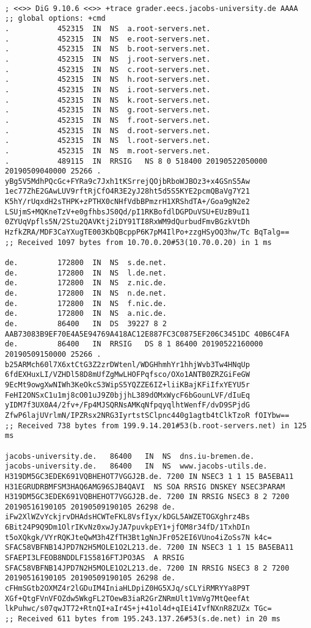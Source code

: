 \documentclass{article}
\begin{document}
\begin{verbatim}

; <<>> DiG 9.10.6 <<>> +trace grader.eecs.jacobs-university.de AAAA
;; global options: +cmd
.			452315	IN	NS	a.root-servers.net.
.			452315	IN	NS	e.root-servers.net.
.			452315	IN	NS	b.root-servers.net.
.			452315	IN	NS	j.root-servers.net.
.			452315	IN	NS	c.root-servers.net.
.			452315	IN	NS	h.root-servers.net.
.			452315	IN	NS	i.root-servers.net.
.			452315	IN	NS	k.root-servers.net.
.			452315	IN	NS	g.root-servers.net.
.			452315	IN	NS	f.root-servers.net.
.			452315	IN	NS	d.root-servers.net.
.			452315	IN	NS	l.root-servers.net.
.			452315	IN	NS	m.root-servers.net.
.			489115	IN	RRSIG	NS 8 0 518400 20190522050000 20190509040000 25266 . yBg5V5MdhPQcGc+FYRa9c7Jxh1tKSrrejQOjbRboWJBOz3+x4GSnS5Aw 1ec77ZhE2GAwLUV9rftRjCfO4R3E2yJ28ht5d5S5KYE2pcmQBaVg7Y21 K5hY/rUqxdH2sTHPK+zPTHX0cNHfVdbBPmzrH1XRShdTA+/Goa9gN2e2 LSUjmS+MQKneTzV+e0gfhbsJS0Qd/pI1RKBofdlDGPDuVSU+EUzB9uI1 0ZYUqVpfls5N/2Stu2QAVKtj2iDY91TI8RxWM9dQurbudFmvBGzkVtDh HzfkZRA/MDF3CaYXugTE003KbQBcppP6K7pM4IlPo+zzgHSyOQ3hw/Tc BqTalg==
;; Received 1097 bytes from 10.70.0.20#53(10.70.0.20) in 1 ms

de.			172800	IN	NS	s.de.net.
de.			172800	IN	NS	l.de.net.
de.			172800	IN	NS	z.nic.de.
de.			172800	IN	NS	n.de.net.
de.			172800	IN	NS	f.nic.de.
de.			172800	IN	NS	a.nic.de.
de.			86400	IN	DS	39227 8 2 AAB73083B9EF70E4A5E94769A418AC12E887FC3C0875EF206C3451DC 40B6C4FA
de.			86400	IN	RRSIG	DS 8 1 86400 20190522160000 20190509150000 25266 . b25ARMch60l7X6xtCtG3Z2zrDWtenl/WDGHhmhYr1hhjWvb3Tw4HNqUp 6fdEXHuxLI/VZHDl58D8mUfZgMwLHOFPqfsco/OXo1ANTB0ZRZGiFeGW 9EcMt9owgXwNIWh3KeOkcS3WipS5YQZZE6IZ+liiKBajKFiIfxYEYU5r FeHI2ONSxC1u1mj8cO01uJ9Z0bjjhL389dOMxWycF6bGounLVF/dIuEq yIDM7f3UX0A4/2fv+/Fp4MJSQRNsAMKqNfpqyqlhtWenfF/dvD9SPjdG ZfwP6lajUVrlmN/IPZRsx2NRG3IyrtstSClpnc440g1agtb4tClkTzoR fOIYbw==
;; Received 738 bytes from 199.9.14.201#53(b.root-servers.net) in 125 ms

jacobs-university.de.	86400	IN	NS	dns.iu-bremen.de.
jacobs-university.de.	86400	IN	NS	www.jacobs-utils.de.
H319DM5GC3EDEK691VQBHEHOT7VGGJ2B.de. 7200 IN NSEC3 1 1 15 BA5EBA11 H31EGRUDRBMFSM3HAQ6AMG96SJB4QAVI  NS SOA RRSIG DNSKEY NSEC3PARAM
H319DM5GC3EDEK691VQBHEHOT7VGGJ2B.de. 7200 IN RRSIG NSEC3 8 2 7200 20190516190105 20190509190105 26298 de. iFw2XlWZvYckjrvDHAdsHCWTeFKL8VsfIyx/kDGL5AWZETOGXghrz4Bs 6Bit24P9Q9Dm1OlrIKvNz0xwJyJA7puvkpEY1+jfOM8r34fD/1TxhDIn t5oXQkgk/VYrRQKJteQwM3h4ZfTH3Bt1gNnJFr052EI6VUno4iZoSs7N k4c=
SFAC58VBFNB14JPD7N2H5MOLE1O2L213.de. 7200 IN NSEC3 1 1 15 BA5EBA11 SFAEPI3LFEOB8NDDLF1S5816FTJPO3AS  A RRSIG
SFAC58VBFNB14JPD7N2H5MOLE1O2L213.de. 7200 IN RRSIG NSEC3 8 2 7200 20190516190105 20190509190105 26298 de. cFHmSGtb2OXMZ4r2lGDuIM4IniaHLDpiZ0HG5XJq/sCLYiRMRYYa8P9T XGf+QtgFVnVFOZdw5WkgFL2TOewB3iaR2GrZNRmUlt1VmVg7MtQeefAt lkPuhwc/s07qwJT72+RtnQI+aIr4S+j+41ol4d+qIEi4IvfNXnR8ZUZx TGc=
;; Received 611 bytes from 195.243.137.26#53(s.de.net) in 20 ms


\end{verbatim}
\end{document}
